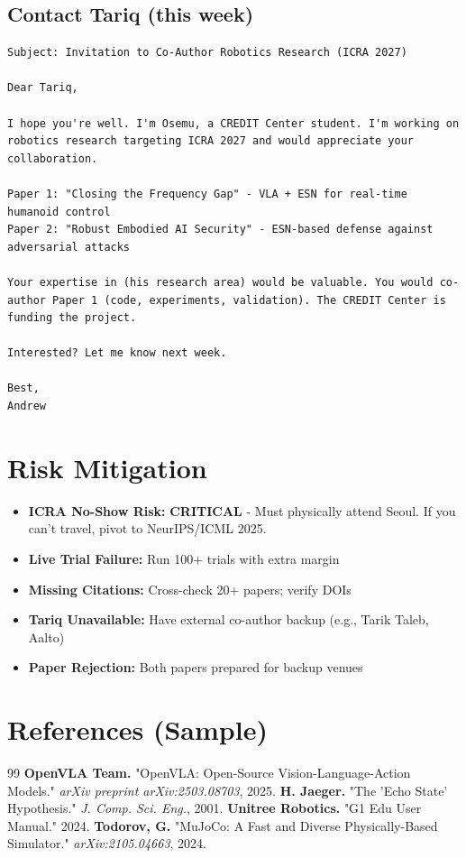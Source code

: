 \documentclass[conference]{IEEEtran}
\begin{document}
\subsection{Contact Tariq (this week)}
\begin{verbatim}
Subject: Invitation to Co-Author Robotics Research (ICRA 2027)

Dear Tariq,

I hope you're well. I'm Osemu, a CREDIT Center student. I'm working on robotics research targeting ICRA 2027 and would appreciate your collaboration.

Paper 1: "Closing the Frequency Gap" - VLA + ESN for real-time humanoid control
Paper 2: "Robust Embodied AI Security" - ESN-based defense against adversarial attacks

Your expertise in (his research area) would be valuable. You would co-author Paper 1 (code, experiments, validation). The CREDIT Center is funding the project.

Interested? Let me know next week.

Best,
Andrew
\end{verbatim}

\section{Risk Mitigation}
\begin{itemize}
    \item \textbf{ICRA No-Show Risk:} \textbf{CRITICAL} - Must physically attend Seoul. If you can't travel, pivot to NeurIPS/ICML 2025.
    \item \textbf{Live Trial Failure:} Run 100+ trials with extra margin
    \item \textbf{Missing Citations:} Cross-check 20+ papers; verify DOIs
    \item \textbf{Tariq Unavailable:} Have external co-author backup (e.g., Tarik Taleb, Aalto)
    \item \textbf{Paper Rejection:} Both papers prepared for backup venues
\end{itemize}

\section{References (Sample)}
\begin{thebibliography}{99}
  \textbf{OpenVLA Team.} "OpenVLA: Open-Source Vision-Language-Action Models." \textit{arXiv preprint arXiv:2503.08703}, 2025.
  \textbf{H. Jaeger.} "The 'Echo State' Hypothesis." \textit{J. Comp. Sci. Eng.}, 2001.
  \textbf{Unitree Robotics.} "G1 Edu User Manual." 2024.
  \textbf{Todorov, G.} "MuJoCo: A Fast and Diverse Physically-Based Simulator." \textit{arXiv:2105.04663}, 2024.
\end{thebibliography}

\balance
\end{document}

